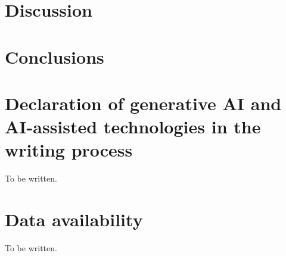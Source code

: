 \documentclass[preprint,12pt]{elsarticle}
\begin{document}
\section{Discussion}

\section{Conclusions}

\section*{Declaration of generative AI and AI-assisted technologies in the writing process}
To be written.

\section*{Data availability}
To be written.



\end{document}
